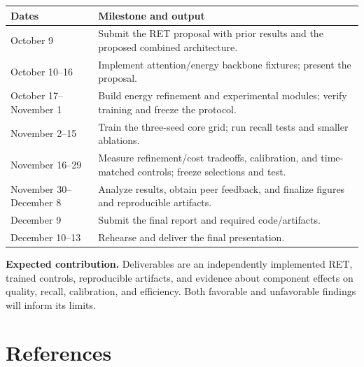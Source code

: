 \documentclass[11pt,letterpaper]{article}
\begin{document}
\smallskip\begin{tabularx}{\textwidth}{@{}p{3.2cm}X@{}}\toprule
\textbf{Dates} & \textbf{Milestone and output}\\\midrule
October 9 & Submit the RET proposal with prior results and the proposed combined architecture.\\
October 10–16 & Implement attention/energy backbone fixtures; present the proposal.\\
October 17–November 1 & Build energy refinement and experimental modules; verify training and freeze the protocol.\\
November 2–15 & Train the three-seed core grid; run recall tests and smaller ablations.\\
November 16–29 & Measure refinement/cost tradeoffs, calibration, and time-matched controls; freeze selections and test.\\
November 30–December 8 & Analyze results, obtain peer feedback, and finalize figures and reproducible artifacts.\\
December 9 & Submit the final report and required code/artifacts.\\
December 10–13 & Rehearse and deliver the final presentation.\\
\bottomrule\end{tabularx}\smallskip

\textbf{Expected contribution.} Deliverables are an independently implemented RET, trained controls, reproducible artifacts, and evidence about component effects on quality, recall, calibration, and efficiency. Both favorable and unfavorable findings will inform its limits.

\newpage
\section*{References}
\end{document}
